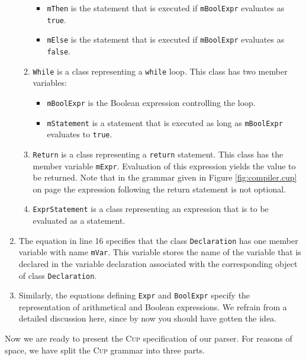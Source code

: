 \begin{enumerate}
\begin{enumerate}
\begin{itemize}
            \item \texttt{mThen} is the statement that is executed if
                  \texttt{mBoolExpr} evaluates as \texttt{true}.
            \item \texttt{mElse} is the statement that is executed if
                  \texttt{mBoolExpr} evaluates as \texttt{false}.
            \end{itemize}
      \item \texttt{While} is a class representing a \texttt{while} loop. 
            This class has two member variables:
            \begin{itemize}
            \item \texttt{mBoolExpr} is the Boolean expression controlling the loop.
            \item \texttt{mStatement} is a statement that is executed as long as
                  \texttt{mBoolExpr} evaluates to \texttt{true}.
            \end{itemize}
      \item \texttt{Return} is a class representing a \texttt{return} statement. 
            This class has the member variable \texttt{mExpr}.  Evaluation of this expression
            yields the value to be returned.  Note that in the grammar given in Figure
            \ref{fig:compiler.cup} on page \pageref{fig:compiler.cup} the expression following the
            return statement is not optional.
      \item \texttt{ExprStatement} is a class representing an expression that is to be
             evaluated as a statement.        
      \end{enumerate}
\item The equation in line 16 specifies that the class \texttt{Declaration} has one member
      variable with name \texttt{mVar}.  This variable stores the name of the variable
      that is declared in the variable declaration associated with the corresponding
      object of class \texttt{Declaration}.
\item Similarly, the equations defining \texttt{Expr} and \texttt{BoolExpr} specify the
      representation of arithmetical and Boolean expressions.  We refrain from a detailed discussion
      here, since by now you should have gotten the idea.
\end{enumerate}
Now we are ready to present the \textsc{Cup} specification of our parser.  For reasons of space,
we have split the \textsc{Cup} grammar into three parts. 

